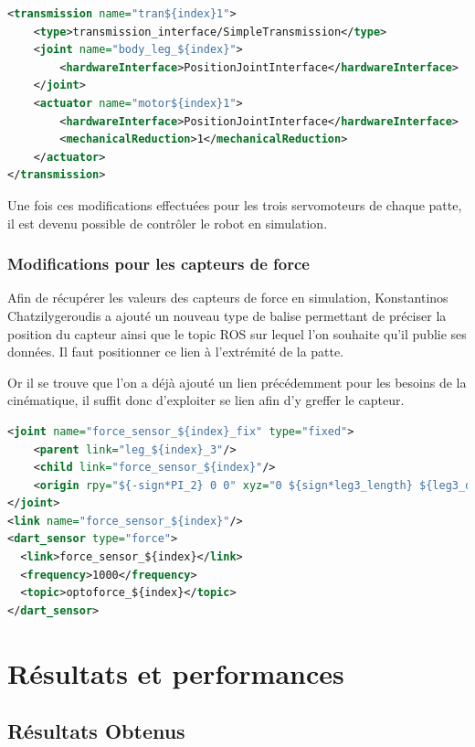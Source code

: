 \documentclass{tnreport}
\begin{document}
\begin{lstlisting}[language=XML,caption={Ajout des transmissions},label={lst:xacrotrans}]
<transmission name="tran${index}1">
    <type>transmission_interface/SimpleTransmission</type>
    <joint name="body_leg_${index}">
        <hardwareInterface>PositionJointInterface</hardwareInterface>
    </joint>
    <actuator name="motor${index}1">
        <hardwareInterface>PositionJointInterface</hardwareInterface>
        <mechanicalReduction>1</mechanicalReduction>
    </actuator>
</transmission>

\end{lstlisting}

Une fois ces modifications effectuées pour les trois servomoteurs de chaque patte, il est devenu possible de contrôler le robot en simulation. 

\subsection{Modifications pour les capteurs de force}
Afin de récupérer les valeurs des capteurs de force en simulation, Konstantinos Chatzilygeroudis a ajouté un nouveau type de balise permettant de préciser la position du capteur ainsi que le topic ROS sur lequel l'on souhaite qu'il publie ses données. Il faut positionner ce lien à l'extrémité de la patte. 

Or il se trouve que l'on a déjà ajouté un lien précédemment pour les besoins de la cinématique, il suffit donc d'exploiter se lien afin d'y greffer le capteur.
\clearpage

\begin{lstlisting}[language=XML,caption={Modifications et ajout du capteur},label={lst:xacrocapteur}]
<joint name="force_sensor_${index}_fix" type="fixed">
    <parent link="leg_${index}_3"/>
    <child link="force_sensor_${index}"/>
    <origin rpy="${-sign*PI_2} 0 0" xyz="0 ${sign*leg3_length} ${leg3_dist}"/>
</joint>
<link name="force_sensor_${index}"/>
<dart_sensor type="force">
  <link>force_sensor_${index}</link>
  <frequency>1000</frequency>
  <topic>optoforce_${index}</topic>
</dart_sensor>

\end{lstlisting}


\chapter{Résultats et performances}


\section{Résultats Obtenus}
\end{document}
